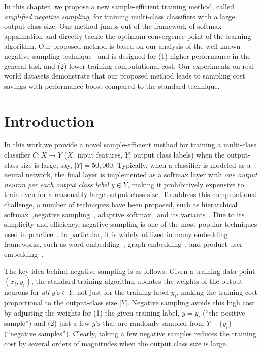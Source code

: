 In this chapter, we propose a new sample-efficient training method, called \emph{amplified negative sampling}, for training multi-class classifiers with a large output-class size. Our method jumps out of the framework of softmax appximation and directly tackle the optimum convergence point of the learning algorithm. Our proposed method is based on our  analysis of the well-known negative sampling technique~\citep{mikolov2013distributed} and is designed for (1) higher performance in the general task and (2) lower training computational cost. Our experiments on real-world datasets demonstrate that our proposed method leads to sampling cost savings with performance boost compared to the standard technique.

\section{Introduction}

In this work,we provide a novel sample-efficient method for training a multi-class classifier $C: X \rightarrow Y$ ($X$: input features, $Y$: output class labels) when the output-class size is large, say, $\vert Y \vert = 50,000$. Typically, when a classifier is modeled as a neural network, the final layer is implemented as a softmax layer with \emph{one output neuron per each output class label} $y \in Y$, making it prohibitively expensive to train even for a reasonably large output-class size. To address this computational challenge, a number of techniques have been proposed, such as hierarchical softmax~\citep{morin2005hierarchical},negative sampling~\citep{mikolov2013efficient}, adaptive softmax~\citep{bengio2008adaptive} and its variants~\citep{rawat2019sampled,blanc2017adaptive,grave2017efficient,chen2015strategies,bai2017tapas}. Due to its simplicity and efficiency, negative sampling is one of the most popular techniques used in practice~\citep{mikolov2013distributed,wang2017knowledge,node2vec-kdd2016,barkan2016item2vec}. In particular, it is widely utilized in many embedding frameworks, such as word embedding~\citep{mikolov2013distributed}, graph embedding~\citep{node2vec-kdd2016,wang2017knowledge}, and product-user embedding~\citep{barkan2016item2vec}.


The key idea behind negative sampling is as follows: Given a training data point $(x_i, y_i)$, the standard training algorithm updates the weights of the output neurons for \emph{all} $y\text{'s} \in Y$, not just for the training label $y_i$, making the training cost proportional to the output-class size $\vert Y \vert$. Negative sampling avoids this high cost by adjusting the weights for (1) the given training label, $y = y_i$ (``the positive sample'') and (2) just a few $y\text{'s}$ that are randomly sampled from $Y - \{y_i\}$ (``negative samples''). Clearly, taking a few negative samples reduces the training cost by several orders of magnitudes when the output class size is large. 

